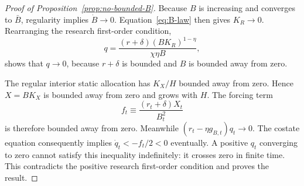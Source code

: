 \begin{proof}[Proof of Proposition~\ref{prop:no-bounded-B}]
Because $B$ is increasing and converges to $\bar B$, regularity implies
$\dot B\to0$. Equation~\eqref{eq:B-law} then gives $K_R\to0$. Rearranging the research first-order condition,
\[
 q
 =\frac{(r+\delta)(BK_R)^{1-\eta}}{\chi\eta B},
\]
shows that $q\to0$, because $r+\delta$ is bounded and $B$ is bounded away from zero.

The regular interior static allocation has $K_X/H$ bounded away from zero. Hence $X=BK_X$ is bounded away from zero and grows with $H$. The forcing term
\[
 f_t\equiv\frac{(r_t+\delta)X_t}{B_t^2}
\]
is therefore bounded away from zero. Meanwhile
$(r_t-\eta g_{B,t})q_t\to0$. The costate equation consequently implies
$\dot q_t<-f_t/2<0$ eventually. A positive $q_t$ converging to zero cannot satisfy this inequality indefinitely: it crosses zero in finite time. This contradicts the positive research first-order condition and proves the result.
\end{proof}

